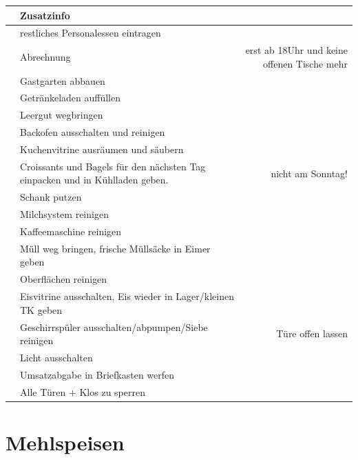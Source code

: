 \documentclass[12pt]{article}
\newcounter{row}
\begin{document}
\setcounter{row}{0}
\begin{tabularx}{\textwidth}{|N|X r|}
    \hline
     & Zusatzinfo \\
    \hline
    & restliches Personalessen eintragen &\\
    & Abrechnung & erst ab 18Uhr und keine offenen Tische mehr\\
    & Gastgarten abbauen &\\
    & Getränkeladen auffüllen & \\
    & Leergut wegbringen & \\
    & Backofen ausschalten und reinigen & \\
    & Kuchenvitrine ausräumen und säubern & \\
    & Croissants und Bagels für den nächsten Tag einpacken und in Kühlladen geben. & nicht am Sonntag! \\
    & Schank putzen &\\
    & Milchsystem reinigen &\\
    & Kaffeemaschine reinigen &\\
    & Müll weg bringen, frische Müllsäcke in Eimer geben&\\
    & Oberflächen reinigen &\\
    & Eisvitrine ausschalten, Eis wieder in Lager/kleinen TK geben &\\
    & Geschirrspüler ausschalten/abpumpen/Siebe reinigen & Türe offen lassen\\
    & Licht ausschalten &\\
    & Umsatzabgabe in Briefkasten werfen &\\
    & Alle Türen + Klos zu sperren &\\
    \hline
\end{tabularx}


\clearpage
\section{Mehlspeisen}
\end{document}
